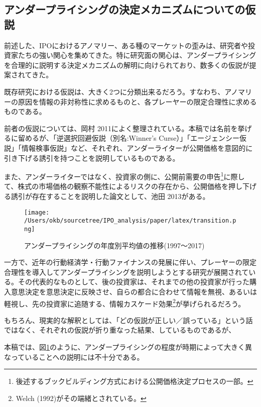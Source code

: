 \documentclass{jsarticle}
\begin{document}
\subsection{アンダープライシングの決定メカニズムについての仮説}
前述した、IPOにおけるアノマリー、ある種のマーケットの歪みは、研究者や投資家たちの強い関心を集めてきた。特に研究面の関心は、アンダープライシングを合理的に説明する決定メカニズムの解明に向けられており、数多くの仮説が提案されてきた。\par
既存研究における仮説は、大きく2つに分類出来るだろう。すなわち、アノマリーの原因を情報の非対称性に求めるものと、各プレーヤーの限定合理性に求めるものである。\par
前者の仮説については、岡村 2011\cite{okamura}によく整理されている。本稿では名前を挙げるに留めるが、「逆選択回避仮説（別名:Winner's Curse）」「エージェンシー仮説」「情報検事仮説」など、それぞれ、アンダーライターが公開価格を意図的に引き下げる誘引を持つことを説明しているものである。\par

また、アンダーライターではなく、投資家の側に、公開前需要の申告\footnote[5]{後述するブックビルディング方式における公開価格決定プロセスの一部。}に際して、株式の市場価格の観察不能性によるリスクの存在から、公開価格を押し下げる誘引が存在することを説明した論文として、池田 2013\cite{ikeda}がある。\par

\begin{figure}[tbp]
  \begin{center}
  \caption{アンダープライシングの年度別平均値の推移(1997〜2017)}
    \texttt{[image: /Users/okb/sourcetree/IPO\_analysis/paper/latex/transition.png]}
    \label{transition}
  \end{center}
\end{figure}

一方で、近年の行動経済学・行動ファイナンスの発展に伴い、プレーヤーの限定合理性を導入してアンダープライシングを説明しようとする研究が展開されている。その代表的なものとして、後の投資家は、それまでの他の投資家が行った購入意思決定を意思決定に反映させ、自らの都合に合わせて情報を無視、あるいは軽視し、先の投資家に追随する、情報カスケード効果\footnote[6]{Welch (1992)\cite{Welch}がその端緒とされている。}が挙げられるだろう。\par

もちろん、現実的な解釈としては、「どの仮説が正しい／誤っている」という話ではなく、それぞれの仮説が折り重なった結果、しているものであるが、

本稿では、図\ref{transition}のように、アンダープライシングの程度が時期によって大きく異なっていることへの説明には不十分である。\par
\end{document}
